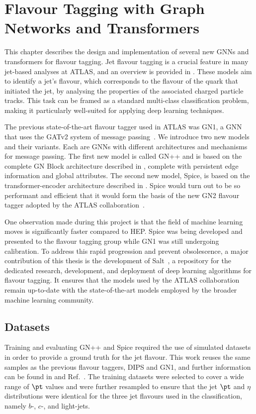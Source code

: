 
\chapter{Flavour Tagging with Graph Networks and Transformers}
\label{ch:spice}

This chapter describes the design and implementation of several new GNNs and transformers for flavour tagging.
Jet flavour tagging is a crucial feature in many jet-based analyses at ATLAS, and an overview is provided in .
These models aim to identify a jet's flavour, which corresponds to the flavour of the quark that initiated the jet, by analysing the properties of the associated charged particle tracks.
This task can be framed as a standard multi-class classification problem, making it particularly well-suited for applying deep learning techniques.

The previous state-of-the-art flavour tagger used in ATLAS was GN1, a GNN that uses the GATv2 system of message passing~\cite{GATv2}.
We introduce two new models and their variants. Each are GNNs with different architectures and mechanisms for message passing.
The first new model is called GN++ and is based on the complete GN Block architecture described in , complete with persistent edge information and global attributes.
The second new model, Spice, is based on the transformer-encoder architecture described in .
Spice would turn out to be so performant and efficient that it would form the basis of the new GN2 flavour tagger adopted by the ATLAS collaboration~\cite{GN2Plots}.

One observation made during this project is that the field of machine learning moves is significantly faster compared to HEP.
Spice was being developed and presented to the flavour tagging group while GN1 was still undergoing calibration.
To address this rapid progression and prevent obsolescence, a major contribution of this thesis is the development of Salt~\cite{Salt}, a repository for the dedicated research, development, and deployment of deep learning algorithms for flavour tagging.
It ensures that the models used by the ATLAS collaboration remain up-to-date with the state-of-the-art models employed by the broader machine learning community.

\section{Datasets}

Training and evaluating GN++ and Spice required the use of simulated datasets in order to provide a ground truth for the jet flavour.
This work reuses the same samples as the previous flavour taggers, DIPS and GN1, and further information can be found in \textcite{AlexThesis} and Ref.~\cite{GN1}.
The training datasets were selected to cover a wide range of $\pt$ values and were further resampled to ensure that the jet $\pt$ and $\eta$ distributions were identical for the three jet flavours used in the classification, namely $b$-, $c$-, and light-jets.

